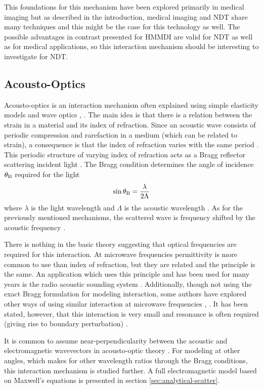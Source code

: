 \documentclass[11pt,twoside]{eitExjobb}
\begin{document}
	This foundations for this mechanism have been explored primarily in medical imaging but as described in the introduction, medical imaging and NDT share many techniques and this might be the case for this technology as well. The possible advantages in contrast presented for HMMDI are valid for NDT as well as for medical applications, so this interaction mechanism should be interesting to investigate for NDT.
	
	\subsection{Acousto-Optics}
	Acousto-optics is an interaction mechanism often explained using simple elasticity models and wave optics \cite{Saleh2007}, \cite{Korpel1981}. The main idea is that there is a relation between the strain in a material and its index of refraction. Since an acoustic wave consists of periodic compression and rarefaction in a medium (which can be related to strain), a consequence is that the index of refraction varies with the same period \cite{Saleh2007}. This periodic structure of varying index of refraction acts as a Bragg reflector scattering incident light \cite{Saleh2007}. The Bragg condition determines the angle of incidence $\theta_{\mathrm{B}}$ required for the light
	\begin{equation*}
		\sin{\theta_{\mathrm{B}}} = \frac{\lambda}{2\Lambda}
	\end{equation*}
	where $\lambda$ is the light wavelength and $\Lambda$ is the acoustic wavelength \cite{Saleh2007}. As for the previously mentioned mechanisms, the scattered wave is frequency shifted by the acoustic frequency \cite{Korpel1988}.
	
	There is nothing in the basic theory suggesting that optical frequencies are required for this interaction. At microwave frequencies permittivity is more common to use than index of refraction, but they are related and the principle is the same. An application which uses this principle and has been used for many years is the radio acoustic sounding system \cite{Buerkle2007}. Additionally, though not using the exact Bragg formulation for modeling interaction, some authors have explored other ways of using similar interaction at microwave frequencies \cite{Lawrence2001}, \cite{Merkel2006}. It has been stated, however, that this interaction is very small and resonance is often required (giving rise to boundary perturbation) \cite{Buerkle2007}.
	
	It is common to assume near-perpendicularity between the acoustic and electromagnetic wavevectors in acousto-optic theory \cite{Korpel1988}. For modeling at other angles, which makes for other wavelength ratios through the Bragg conditions, this interaction mechanism is studied further. A full electromagnetic model based on Maxwell's equations is presented in section \ref{sec:analytical-scatter}.
	
\end{document}
